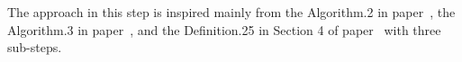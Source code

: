 The approach in this step is inspired mainly from the Algorithm.2 in paper~\cite{SinnZV14},
  the Algorithm.3 in paper~\cite{ZulegerGSV11},
  and the Definition.25 in Section 4 of paper~\cite{SinnZV17} with three sub-steps.


